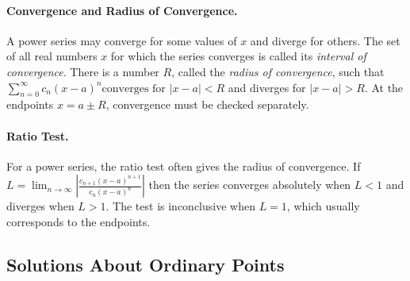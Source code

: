 \documentclass[oneside]{book}
\begin{document}

\paragraph{Convergence and Radius of Convergence.}
A power series may converge for some values of $x$ and diverge for others. The set
of all real numbers $x$ for which the series converges is called its
\emph{interval of convergence}. There is a number $R$, called the
\emph{radius of convergence}, such that
$
    \sum_{n=0}^{\infty} c_n(x-a)^n
    \text{converges for } |x-a|<R
$
and diverges for $|x-a|>R$. At the endpoints $x=a\pm R$, convergence must be
checked separately.

\paragraph{Ratio Test.}
For a power series, the ratio test often gives the radius of convergence. If
$
    L
    =
    \lim_{n\to\infty}
    \left|
        \frac{c_{n+1}(x-a)^{n+1}}{c_n(x-a)^n}
    \right|
$
then the series converges absolutely when $L<1$ and diverges when $L>1$.
The test is inconclusive when $L=1$, which usually corresponds to the endpoints.




\subsection{Solutions About Ordinary Points}

\end{document}
